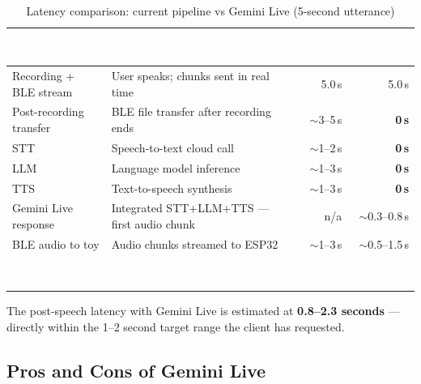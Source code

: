 \documentclass[12pt,a4paper]{article}
\begin{document}
\begin{table}[h!]
\centering
\renewcommand{\arraystretch}{1.4}
\begin{tabularx}{\linewidth}{|l|X|r|r|}
\hline
\rowcolor{primary}
\textcolor{white}{\textbf{Stage}} &
\textcolor{white}{\textbf{Description}} &
\textcolor{white}{\textbf{Current}} &
\textcolor{white}{\textbf{Gemini Live}} \\
\hline
Recording + BLE stream  & User speaks; chunks sent in real time  & 5.0\,s & 5.0\,s \\
\hline
\rowcolor{rowalt}
Post-recording transfer & BLE file transfer after recording ends & $\sim$3--5\,s & \textbf{0\,s} \\
\hline
STT                     & Speech-to-text cloud call              & $\sim$1--2\,s & \textbf{0\,s} \\
\hline
\rowcolor{rowalt}
LLM                     & Language model inference               & $\sim$1--3\,s & \textbf{0\,s} \\
\hline
TTS                     & Text-to-speech synthesis               & $\sim$1--3\,s & \textbf{0\,s} \\
\hline
\rowcolor{rowalt}
Gemini Live response    & Integrated STT+LLM+TTS — first audio chunk & n/a & $\sim$0.3--0.8\,s \\
\hline
BLE audio to toy        & Audio chunks streamed to ESP32         & $\sim$1--3\,s & $\sim$0.5--1.5\,s \\
\hline
\rowcolor{primary}
\textcolor{white}{\textbf{Post-speech latency}} &
\textcolor{white}{\textbf{Time from button release to first audio heard}} &
\textcolor{white}{\textbf{$\sim$7--16\,s}} &
\textcolor{white}{\textbf{$\sim$0.8--2.3\,s}} \\
\hline
\end{tabularx}
\caption{Latency comparison: current pipeline vs Gemini Live (5-second utterance)}
\end{table}

The post-speech latency with Gemini Live is estimated at \textbf{0.8--2.3 seconds} — directly
within the 1--2 second target range the client has requested.

\subsection{Pros and Cons of Gemini Live}
\end{document}
